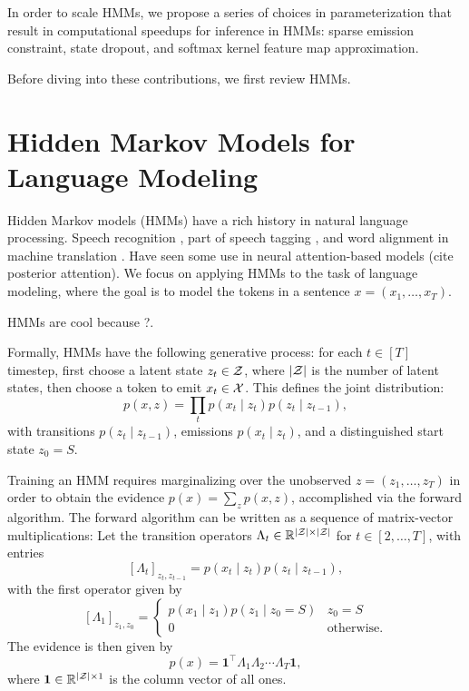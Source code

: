 \documentclass{article}
\begin{document}
In order to scale HMMs, we propose a series of choices in parameterization
that result in computational speedups for inference in HMMs:
sparse emission constraint, state dropout, and softmax kernel feature map approximation.

Before diving into these contributions, we first review HMMs.

\section{Hidden Markov Models for Language Modeling}
Hidden Markov models (HMMs) have a rich history in natural language processing.
Speech recognition \citep{rabiner1990tut},
part of speech tagging \citep{merialdo1994tagging}, 
and word alignment in machine translation \citep{vogel1996hmm}.
Have seen some use in neural attention-based models (cite posterior attention).
We focus on applying HMMs to the task of language modeling,
where the goal is to model the tokens in a sentence $x = (x_1,\ldots,x_T)$.

HMMs are cool because ?.

Formally, HMMs have the following generative process:
for each $t \in [T]$ timestep, first choose a latent state $z_t \in \mathcal{Z}$,
where $|\mathcal{Z}|$ is the number of latent states,
then choose a token to emit $x_t \in \mathcal{X}$.
This defines the joint distribution:
\begin{equation}
p(x,z) = \prod_t p(x_t\mid z_t) p(z_t \mid z_{t-1}),
\end{equation}
with transitions $p(z_t \mid z_{t-1})$, emissions $p(x_t \mid z_t)$,
and a distinguished start state $z_0 = S$.

Training an HMM requires marginalizing over the unobserved
$z = (z_1,\ldots,z_T)$ in order to obtain the evidence $p(x) = \sum_z p(x,z)$,
accomplished via the forward algorithm.
The forward algorithm can be written as a sequence of matrix-vector multiplications:
Let the transition operators $\Lambda_t\in\mathbb{R}^{|\mathcal{Z}|\times|\mathcal{Z}|}$ for $t\in[2,\ldots,T]$, 
with entries $$[\Lambda_t]_{z_t,z_{t-1}} = p(x_t\mid z_t)p(z_t\mid z_{t-1}),$$
with the first operator given by
$$[\Lambda_1]_{z_1,z_0} = \begin{cases}
p(x_1 \mid z_1) p(z_1 \mid z_0=S) & z_0 = S\\
0 & \textrm{otherwise}.
\end{cases}
$$
The evidence is then given by
\begin{equation}
p(x) = \mathbf{1}^\top\Lambda_1\Lambda_2\cdots\Lambda_T\mathbf{1},
\end{equation}
where $\mathbf{1}\in\mathbb{R}^{|\mathcal{Z}|\times1}$ is the column vector of all ones.
\end{document}
